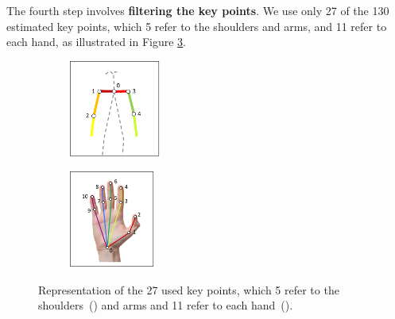 The fourth step involves \textbf{filtering the key points}. We use only 27 of the 130 estimated key points, which 5 refer to the shoulders and arms, and 11 refer to each hand, as illustrated in Figure \ref{fig:filtered-keypoints}. \\[-8mm]%



\begin{figure}
    \centering
    \begin{subfigure}{3.0cm}
        \centering
        \includegraphics[height=3.2cm]{images/filtered_keypoints_body}
        \caption{}
        \label{fig:filtered-keypoints-body}
    \end{subfigure}
    \begin{subfigure}{3.0cm}
      \centering
      \includegraphics[height=3.2cm]{images/filtered_keypoints_hand}
      \caption{}
      \label{fig:filtered-keypoints-hand}
    \end{subfigure}
    \caption{
        Representation of the 27 used key points, which 5 refer to the shoulders~() and arms and 11 refer to each hand~().
    }
    \label{fig:filtered-keypoints}
\end{figure}

